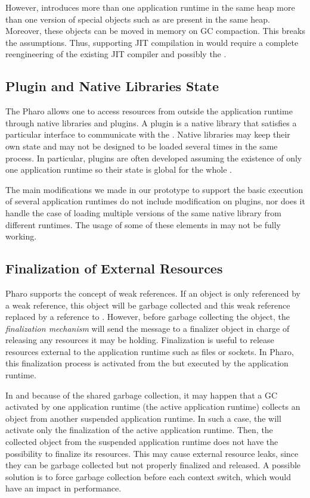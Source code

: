 However, \Vtt introduces more than one application runtime in the same heap \eg more than one version of special objects such as  are present in the same heap. Moreover, these objects can be moved in memory on GC compaction. This breaks the \JIT assumptions. Thus, supporting JIT compilation in \Vtt would require a complete reengineering of the existing JIT compiler and possibly the \VM.

\subsection{Plugin and Native Libraries State}

The Pharo \VM allows one to access resources from outside the application runtime through native libraries and \VM plugins. A \VM plugin is a native library that satisfies a particular interface to communicate with the \VM. Native libraries may keep their own state and may not be designed to be loaded several times in the same process. In particular, \VM plugins are often developed assuming the existence of only one application runtime so their state is global for the whole \VM.

The main \VM modifications we made in our prototype to support the basic execution of several application runtimes do not include modification on \VM plugins, nor does it handle the case of loading multiple versions of the same native library from different runtimes. The usage of some of these elements in \Vtt may not be fully working.

\subsection{Finalization of External Resources}

Pharo \VM supports the concept of weak references. If an object is only referenced by a weak reference, this object will be garbage collected and this weak reference replaced by a reference to . However, before garbage collecting the object, the \emph{finalization mechanism} will send the  message to a finalizer object in charge of releasing any resources it may be holding. Finalization is useful to release resources external to the application runtime such as files or sockets. In Pharo, this finalization process is activated from the \VM but executed by the application runtime.

In \Vtt and because of the shared garbage collection, it may happen that a GC activated by one application runtime (the active application runtime) collects an object from another suspended application runtime. In such a case, the \VM will activate only the finalization of the active application runtime. Then, the collected object from the suspended application runtime does not have the possibility to finalize its resources. This may cause external resource leaks, since they can be garbage collected but not properly finalized and released. A possible solution is to force garbage collection before each context switch, which would have an impact in performance.

